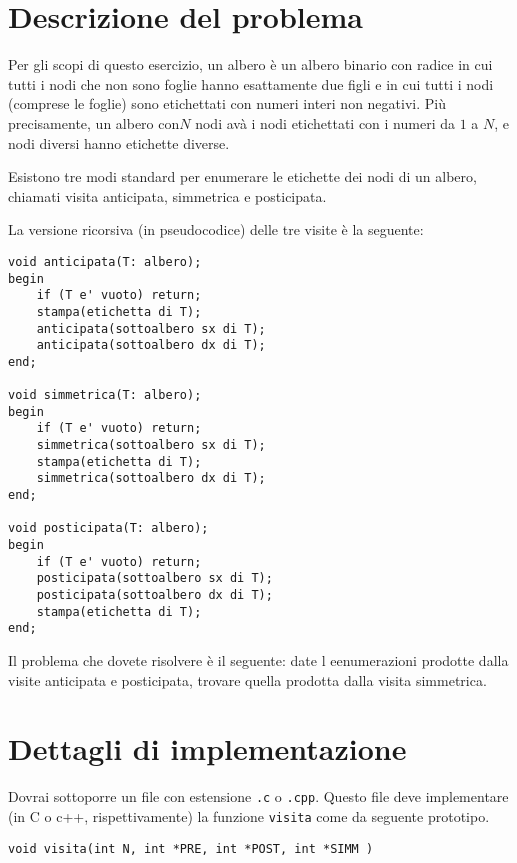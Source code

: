 \documentclass[a4paper,11pt]{article}
\newcommand{\gara}{OII 2003}
\newcommand{\nome}{Alberi}
\newcommand{\nomebreve}{alberi}
\begin{document}
\noindent{\Large \gara}
\vspace{0.5cm}

\noindent{\Huge \textbf \nome~(\texttt{\nomebreve})}

\section*{Descrizione del problema}

Per gli scopi di questo esercizio, un albero è un albero binario con radice in cui tutti i nodi che non sono foglie hanno esattamente due figli e in cui tutti i nodi (comprese le foglie) sono etichettati con numeri interi non negativi.
Più precisamente, un albero con$N$ nodi av\`a i nodi etichettati con i numeri da $1$ a $N$, e nodi diversi hanno etichette diverse.

Esistono tre modi standard per enumerare le etichette dei nodi di un albero, chiamati visita anticipata, simmetrica e posticipata.

La versione ricorsiva (in pseudocodice) delle tre visite è la seguente:

\begin{verbatim}
void anticipata(T: albero);
begin
    if (T e' vuoto) return;
    stampa(etichetta di T);
    anticipata(sottoalbero sx di T);
    anticipata(sottoalbero dx di T);
end;

void simmetrica(T: albero);
begin
    if (T e' vuoto) return;
    simmetrica(sottoalbero sx di T);
    stampa(etichetta di T);
    simmetrica(sottoalbero dx di T);
end;

void posticipata(T: albero);
begin
    if (T e' vuoto) return;
    posticipata(sottoalbero sx di T);
    posticipata(sottoalbero dx di T);
    stampa(etichetta di T);
end;
\end{verbatim}


Il problema che dovete risolvere è il seguente: date l eenumerazioni prodotte dalla visite anticipata e posticipata, trovare quella prodotta dalla visita simmetrica.


\section*{Dettagli di implementazione}
Dovrai sottoporre un file con estensione \texttt{.c} o
\texttt{.cpp}. Questo file deve implementare (in C o c++, rispettivamente)
la funzione \texttt{visita} come da seguente prototipo.

\begin{verbatim}
void visita(int N, int *PRE, int *POST, int *SIMM )
\end{verbatim}
\end{document}
